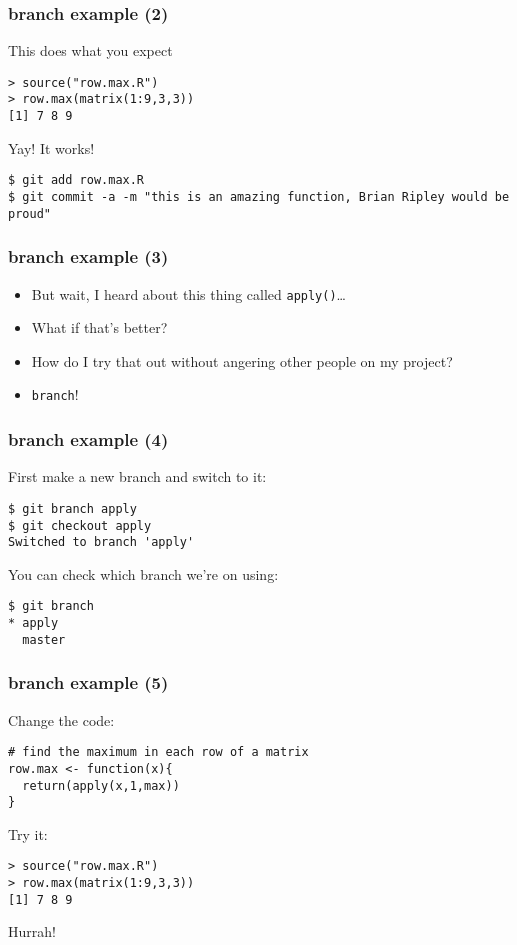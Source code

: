 \documentclass[ignorenonframetext,]{beamer}
\begin{document}
\begin{frame}[fragile]\frametitle{branch example (2)}

This does what you expect

\begin{verbatim}
> source("row.max.R")
> row.max(matrix(1:9,3,3))
[1] 7 8 9
\end{verbatim}

Yay! It works!

\begin{verbatim}
$ git add row.max.R
$ git commit -a -m "this is an amazing function, Brian Ripley would be proud"
\end{verbatim}

\end{frame}

\begin{frame}[fragile]\frametitle{branch example (3)}

\begin{itemize}[<+->]
\item
  But wait, I heard about this thing called \texttt{apply()}\ldots{}
\item
  What if that's better?
\item
  How do I try that out without angering other people on my project?
\item
  \texttt{branch}!
\end{itemize}

\end{frame}

\begin{frame}[fragile]\frametitle{branch example (4)}

First make a new branch and switch to it:

\begin{verbatim}
$ git branch apply
$ git checkout apply
Switched to branch 'apply'
\end{verbatim}

You can check which branch we're on using:

\begin{verbatim}
$ git branch
* apply
  master
\end{verbatim}

\end{frame}

\begin{frame}[fragile]\frametitle{branch example (5)}

Change the code:

\begin{verbatim}
# find the maximum in each row of a matrix
row.max <- function(x){
  return(apply(x,1,max))
}
\end{verbatim}

Try it:

\begin{verbatim}
> source("row.max.R")
> row.max(matrix(1:9,3,3))
[1] 7 8 9
\end{verbatim}

Hurrah!

\end{frame}
\end{document}
